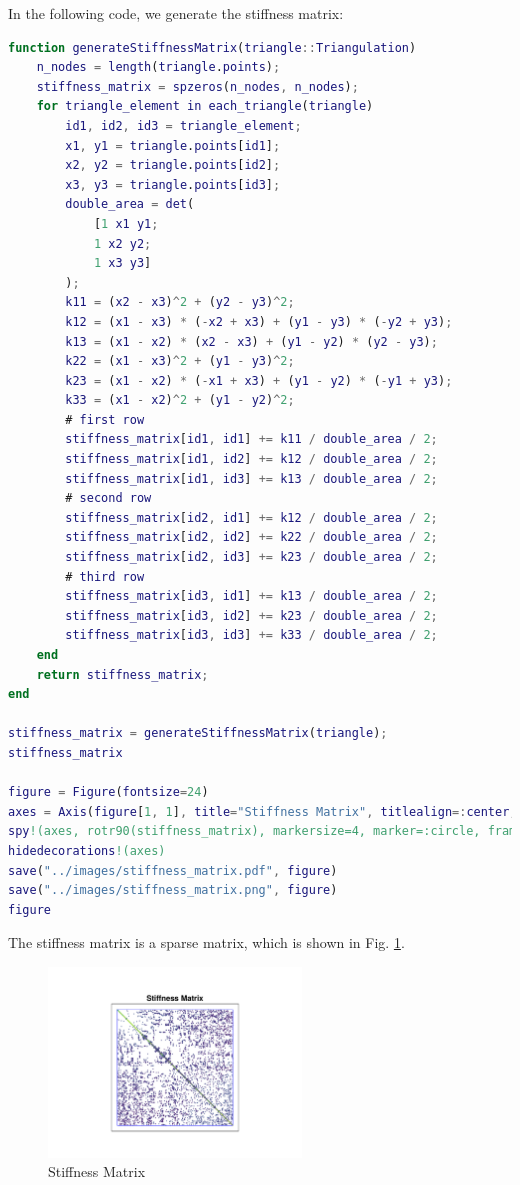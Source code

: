 In the following code, we generate the stiffness matrix:
\begin{lstlisting}[language=matlab]
function generateStiffnessMatrix(triangle::Triangulation)
    n_nodes = length(triangle.points);
    stiffness_matrix = spzeros(n_nodes, n_nodes);
    for triangle_element in each_triangle(triangle)
        id1, id2, id3 = triangle_element;
        x1, y1 = triangle.points[id1];
        x2, y2 = triangle.points[id2];
        x3, y3 = triangle.points[id3];
        double_area = det(
            [1 x1 y1;
            1 x2 y2;
            1 x3 y3]
        );
        k11 = (x2 - x3)^2 + (y2 - y3)^2;
        k12 = (x1 - x3) * (-x2 + x3) + (y1 - y3) * (-y2 + y3);
        k13 = (x1 - x2) * (x2 - x3) + (y1 - y2) * (y2 - y3);
        k22 = (x1 - x3)^2 + (y1 - y3)^2;
        k23 = (x1 - x2) * (-x1 + x3) + (y1 - y2) * (-y1 + y3);
        k33 = (x1 - x2)^2 + (y1 - y2)^2;
        # first row
        stiffness_matrix[id1, id1] += k11 / double_area / 2;
        stiffness_matrix[id1, id2] += k12 / double_area / 2;
        stiffness_matrix[id1, id3] += k13 / double_area / 2;
        # second row
        stiffness_matrix[id2, id1] += k12 / double_area / 2;
        stiffness_matrix[id2, id2] += k22 / double_area / 2;
        stiffness_matrix[id2, id3] += k23 / double_area / 2;
        # third row
        stiffness_matrix[id3, id1] += k13 / double_area / 2;
        stiffness_matrix[id3, id2] += k23 / double_area / 2;
        stiffness_matrix[id3, id3] += k33 / double_area / 2;
    end
    return stiffness_matrix;
end

stiffness_matrix = generateStiffnessMatrix(triangle);
stiffness_matrix

figure = Figure(fontsize=24)
axes = Axis(figure[1, 1], title="Stiffness Matrix", titlealign=:center, width=400, height=400)
spy!(axes, rotr90(stiffness_matrix), markersize=4, marker=:circle, framecolor=:blue)
hidedecorations!(axes)
save("../images/stiffness_matrix.pdf", figure)
save("../images/stiffness_matrix.png", figure)
figure
\end{lstlisting}

The stiffness matrix is a sparse matrix,
which is shown in Fig. \ref{fig:stiffness_matrix}.
\begin{figure}[H]
    \centering
    \includegraphics[width=0.6\textwidth]{../problem1/images/stiffness_matrix.pdf}
    \caption{Stiffness Matrix}
    \label{fig:stiffness_matrix}
\end{figure}

